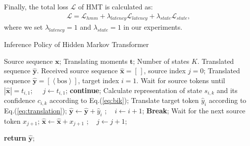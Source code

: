 \documentclass{article} %
\begin{document}
Finally, the total loss $\mathcal{L}$ of HMT is calculated as:
\begin{gather}
\mathcal{L}=\mathcal{L}_{hmm}+\lambda_{latency}\mathcal{L}_{latency}+\lambda_{state}\mathcal{L}_{state},
\end{gather}
where we set $\lambda_{latency}=1$ and $\lambda_{state}=1$ in our experiments.

\begin{algorithm}[t]
\small
\caption{Inference Policy of Hidden Markov Transformer}\label{alg}
\begin{algorithmic}[1]
\renewcommand{\algorithmicrequire}{\textbf{Input:}}
\Require Source sequence $\mathbf{x}$; Translating moments $\mathbf{t}$; Number of states $K$.
\renewcommand{\algorithmicrequire}{\textbf{Output:}}
\Require Translated sequence $\hat{\mathbf{y}}$.
\renewcommand{\algorithmicrequire}{\textbf{Init:}}
\Require Received source sequence $\hat{\mathbf{x}}\!=\!\left [\,  \right ]$, source index $j\!=\!0$; Translated sequence $\hat{\mathbf{y}}\!=\!\left [\left< \mathrm{bos}\right>  \right ]$, target index $i\!=\!1$.
     \textcolor{gray}{}
        \State Wait for source tokens until $\left|\hat{\mathbf{x}}\right|= t_{i,1}$; $\;\;\;$ $j \leftarrow t_{i,1}$;
        \EndIf
         \textbf{continue}; \textcolor{gray}{}
        \EndIf
        \State Calculate representation of state $s_{i,k}$ and its confidence $c_{i,k}$ according to Eq.(\ref{eq:bik});
         \textcolor{blue}{}
            \State Translate target token $\hat{y}_{i}$ according to Eq.(\ref{eq:translation});  %
            \State $\hat{\mathbf{y}}\leftarrow \hat{\mathbf{y}}+\hat{y}_{i}$ ;$\;\;\;$ $i \leftarrow i+1$;
            \State \textbf{Break};
        \Else \textcolor{red}{}
            \State Wait for the next source token $x_{j+1}$;%
            \State $\hat{\mathbf{x}}\leftarrow \hat{\mathbf{x}}+x_{j+1}$ ;$\;\;\;$  $j \leftarrow j+1$;
        \EndIf
    \EndFor
\EndWhile
   
\State \textbf{return} $\hat{\mathbf{y}}$;
\end{algorithmic}
\end{algorithm}
\end{document}
